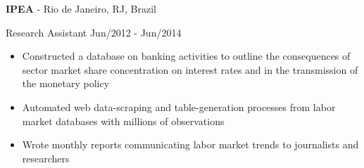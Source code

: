 \documentclass[11pt]{article}
\newenvironment{lonelist}[1][\enskip\textbullet]%
	{\begin{list}{#1}{%
				\setlength{\partopsep}{0pt}%
				\setlength{\topsep}{0pt}}}
		{\end{list}\vspace{-.6\baselineskip}}
\newenvironment{innerlist}[1][\enskip\textbullet]%
	{\begin{itemize}[#1,leftmargin=*,parsep=0pt,itemsep=0pt,topsep=0pt,partopsep=0pt]}
		{\end{itemize}}
\begin{document}
		\begin{lonelist}
			\item[] \textbf{IPEA} - Rio de Janeiro, RJ, Brazil 
			\item[] Research Assistant  \hfill Jun/2012 - Jun/2014
			\begin{innerlist}
				\item Constructed a database on banking activities to outline the consequences of sector market share concentration on interest rates and in the transmission of the monetary policy
				\vspace{.05in}
				\item Automated web data-scraping and table-generation processes from labor market databases with millions of observations
				\vspace{.05in}
				\item Wrote monthly reports communicating labor market trends to journalists and researchers
				\vspace{.05in}
			\end{innerlist}
		\end{lonelist}
\end{document}
